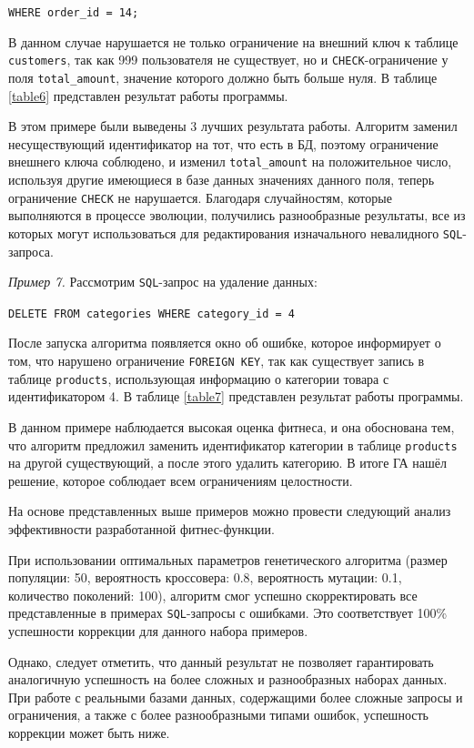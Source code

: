 \documentclass[master,paper]{pmk-graduate}
\begin{document}
\texttt{WHERE order\_id = 14;}

В данном случае нарушается не только ограничение на внешний ключ к таблице \texttt{customers}, так как 999 пользователя не существует, но и \texttt{CHECK}-ограничение у поля \texttt{total\_amount}, значение которого должно быть больше нуля. В таблице \ref{table6} представлен результат работы программы.

В этом примере были выведены 3 лучших результата работы. Алгоритм заменил несуществующий идентификатор на тот, что есть в БД, поэтому ограничение внешнего ключа соблюдено, и изменил \texttt{total\_amount} на положительное число, используя другие имеющиеся в базе данных значениях данного поля, теперь ограничение \texttt{CHECK} не нарушается. Благодаря случайностям, которые выполняются в процессе эволюции, получились разнообразные результаты, все из которых могут использоваться для редактирования изначального невалидного \texttt{SQL}-запроса.

\textit{Пример 7.} Рассмотрим \texttt{SQL}-запрос на удаление данных:

\texttt{DELETE FROM categories WHERE category\_id = 4}

После запуска алгоритма появляется окно об ошибке, которое информи\-рует о том, что нарушено ограничение \texttt{FOREIGN KEY}, так как существует запись в таблице \texttt{products}, использующая информацию о категории товара с идентификатором 4. В таблице \ref{table7} представлен результат работы программы.

В данном примере наблюдается высокая оценка фитнеса, и она обоснована тем, что алгоритм предложил заменить идентификатор категории в таблице \texttt{products} на другой существующий, а после этого удалить категорию. В итоге ГА нашёл решение, которое соблюдает всем ограничениям целостности.

На основе представленных выше примеров можно провести следующий анализ эффективности разработанной фитнес-функции. 

При использовании оптимальных параметров генетического алгоритма (размер популяции: 50, вероятность кроссовера: 0.8, вероятность мутации: 0.1, количество поколений: 100), алгоритм смог успешно скорректировать все представленные в примерах \texttt{SQL}-запросы с ошибками. Это соответствует 100\% успешности коррекции для данного набора примеров.

Однако, следует отметить, что данный результат не позволяет гарантировать аналогичную успешность на более сложных и разнообразных наборах данных. При работе с реальными базами данных, содержащими более сложные запросы и ограничения, а также с более разнообразными типами ошибок, успешность коррекции может быть ниже.
\end{document}
